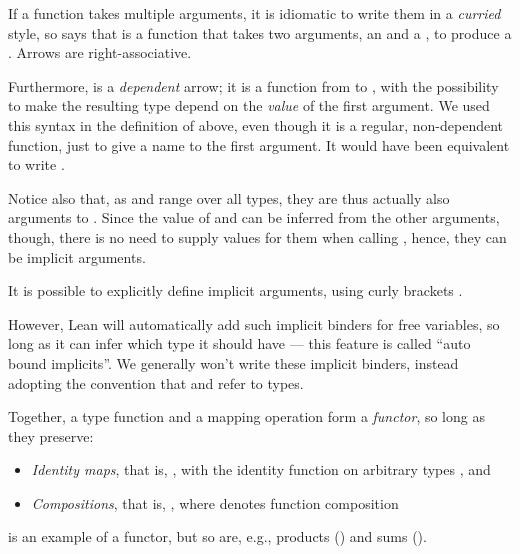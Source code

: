 \begin{remark}
    If a function takes multiple arguments, it is idiomatic to write them in a \emph{curried} style,
    so  says that  is a function that takes two arguments, an  and a , to produce a . Arrows are right-associative.

    Furthermore,  is a \emph{dependent} arrow; it is a function from  to , with the possibility to make the resulting type depend on the \emph{value}  of the first argument. 
    We used this syntax in the definition of  above, even though it is a regular, non-dependent function, just to give a name to the first argument. 
    It would have been equivalent to write .

    Notice also that, as  and  range over all types, they are thus actually also arguments to . Since the value of  and  can be inferred from the other arguments, though, there is no need to supply values for them when calling , hence, they can be implicit arguments. 
    
    It is possible to explicitly define implicit arguments, using curly brackets .
    \begin{center}
    \end{center}
    However, Lean will automatically add such implicit binders for free variables, so long as it can infer which type it should have --- this feature is called ``auto bound implicits''. 
    We generally won't write these implicit binders, instead adopting the convention that  and  refer to types.
\end{remark}

Together, a type function  and a mapping operation  form a \emph{functor}, so long as they preserve: 
\begin{itemize}
    \item \emph{Identity maps}, that is, , with  the identity function on arbitrary types , and
    \item \emph{Compositions}, that is, , where  denotes function composition
\end{itemize}
 is an example of a functor, but so are, e.g., products () and sums 
().

